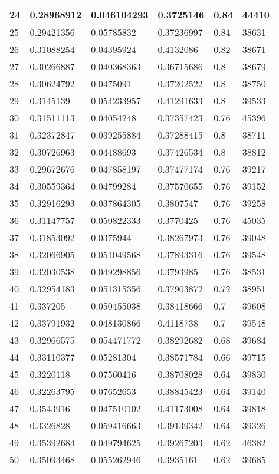 \begin{longtable}{|l|l|l|l|l|l|}
24 & 0.28968912 & 0.046104293 & 0.3725146 & 0.84 & 44410 \\ \hline 
25 & 0.29421356 & 0.05785832 & 0.37236997 & 0.84 & 38631 \\ \hline 
26 & 0.31088254 & 0.04395924 & 0.4132086 & 0.82 & 38671 \\ \hline 
27 & 0.30266887 & 0.040368363 & 0.36715686 & 0.8 & 38679 \\ \hline 
28 & 0.30624792 & 0.0475091 & 0.37202522 & 0.8 & 38750 \\ \hline 
29 & 0.3145139 & 0.054233957 & 0.41291633 & 0.8 & 39533 \\ \hline 
30 & 0.31511113 & 0.04054248 & 0.37357423 & 0.76 & 45396 \\ \hline 
31 & 0.32372847 & 0.039255884 & 0.37288415 & 0.8 & 38711 \\ \hline 
32 & 0.30726963 & 0.04488693 & 0.37426534 & 0.8 & 38812 \\ \hline 
33 & 0.29672676 & 0.047858197 & 0.37477174 & 0.76 & 39217 \\ \hline 
34 & 0.30559364 & 0.04799284 & 0.37570655 & 0.76 & 39152 \\ \hline 
35 & 0.32916293 & 0.037864305 & 0.3807547 & 0.76 & 39258 \\ \hline 
36 & 0.31147757 & 0.050822333 & 0.3770425 & 0.76 & 45035 \\ \hline 
37 & 0.31853092 & 0.0375944 & 0.38267973 & 0.76 & 39048 \\ \hline 
38 & 0.32066905 & 0.051049568 & 0.37893316 & 0.76 & 39548 \\ \hline 
39 & 0.32030538 & 0.049298856 & 0.3793985 & 0.76 & 38531 \\ \hline 
40 & 0.32954183 & 0.051315356 & 0.37903872 & 0.72 & 38951 \\ \hline 
41 & 0.337205 & 0.050455038 & 0.38418666 & 0.7 & 39608 \\ \hline 
42 & 0.33791932 & 0.048130866 & 0.4118738 & 0.7 & 39548 \\ \hline 
43 & 0.32966575 & 0.054471772 & 0.38292682 & 0.68 & 39684 \\ \hline 
44 & 0.33110377 & 0.05281304 & 0.38571784 & 0.66 & 39715 \\ \hline 
45 & 0.3220118 & 0.07560416 & 0.38708028 & 0.64 & 39830 \\ \hline 
46 & 0.32263795 & 0.07652653 & 0.38845423 & 0.64 & 39140 \\ \hline 
47 & 0.3543916 & 0.047510102 & 0.41173008 & 0.64 & 39818 \\ \hline 
48 & 0.3326828 & 0.059416663 & 0.39139342 & 0.64 & 39326 \\ \hline 
49 & 0.35392684 & 0.049794625 & 0.39267203 & 0.62 & 46382 \\ \hline 
50 & 0.35093468 & 0.055262946 & 0.3935161 & 0.62 & 39685 \\ \hline 
\end{longtable}